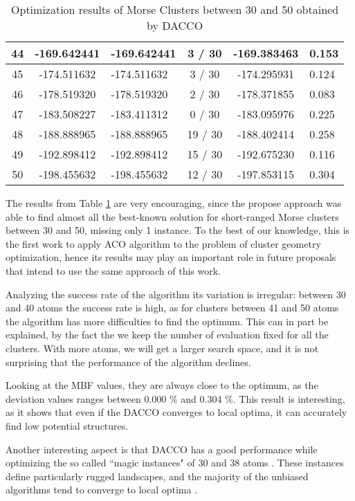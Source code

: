 \begin{table}[!htbp]
\begin{center}
\begin{tabular}{| c | c | p{3cm} | c | c | p{2cm} |}
				44 & -169.642441 & -169.642441 & 3 / 30 & -169.383463 & 0.153 \\ \hline
				45 & -174.511632 & -174.511632 & 3 / 30 & -174.295931 & 0.124 \\ \hline
				46 & -178.519320 & -178.519320 & 2 / 30 & -178.371855 & 0.083 \\ \hline
				47 & -183.508227 & -183.411312 & 0 / 30 & -183.095976 & 0.225 \\ \hline
				48 & -188.888965 & -188.888965 & 19 / 30 & -188.402414 & 0.258 \\ \hline
				49 & -192.898412 & -192.898412 & 15 / 30 & -192.675230 & 0.116 \\ \hline
				50 & -198.455632 & -198.455632 & 12 / 30 & -197.853115 & 0.304 \\ \hline
			\end{tabular}
		\caption{Optimization results of Morse Clusters between 30 and 50 obtained by DACCO}
		\label{tab:optimization_results}
		\end{center}
	\end{table}
	
	The results from Table \ref{tab:optimization_results} are very encouraging, since the propose approach was able to find almost all the best-known solution for short-ranged Morse clusters between 30 and 50, missing only 1 instance.
	To the best of our knowledge, this is the first work to apply ACO algorithm to the problem of cluster geometry optimization, hence its results may play an important role in future proposals that intend to use the same approach of this work.
	
	Analyzing the success rate of the algorithm its variation is irregular: between 30 and 40 atoms the success rate is high, as for clusters between 41 and 50 atoms the algorithm has more difficulties to find the optimum. This can in part be explained, by the fact the we keep the number of evaluation fixed for all the clusters. With more atoms, we will get a larger search space, and it is not surprising that the performance of the algorithm declines.
	
	Looking at the MBF values, they are always close to the optimum, as the deviation values ranges between 0.000 \% and 0.304 \%. This result is interesting, as it shows that even if the DACCO converges to local optima, it can accurately find low potential structures.
	
	Another interesting aspect is that DACCO has a good performance while optimizing the so called ``magic instances" of 30 and 38 atoms \cite{doye97}. These instances define particularly rugged landscapes, and the majority of the unbiased algorithms tend to converge to local optima \cite{doye97, grosso07}.
	
